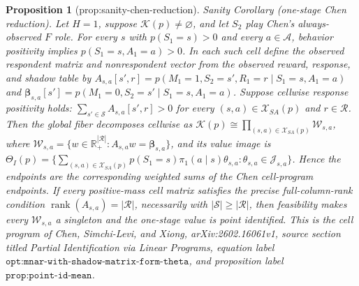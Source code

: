 \documentclass{article}
\newtheorem{proposition}{Proposition}
\begin{document}
\begin{proposition}[prop:sanity-chen-reduction]\label{prop:sanity-chen-reduction}
Sanity Corollary (one-stage Chen reduction). Let \(H=1\), suppose \(\mathcal K(p)\ne\varnothing\), and let \(S_2\) play Chen's always-observed \(F\) role. For every \(s\) with \(p(S_1=s)>0\) and every \(a\in\mathcal A\), behavior positivity implies \(p(S_1=s,A_1=a)>0\). In each such cell define the observed respondent matrix and nonrespondent vector from the observed reward, response, and shadow table by \(A_{s,a}[s',r]=p(M_1=1,S_2=s',R_1=r\mid S_1=s,A_1=a)\) and \(\boldsymbol\beta_{s,a}[s']=p(M_1=0,S_2=s'\mid S_1=s,A_1=a)\). Suppose cellwise response positivity holds: \(\sum_{s'\in\mathcal S}A_{s,a}[s',r]>0\) for every \((s,a)\in\mathcal X_{SA}(p)\) and \(r\in\mathcal R\). Then the global fiber decomposes cellwise as \(\mathcal K(p)\cong\prod_{(s,a)\in\mathcal X_{SA}(p)}\mathcal W_{s,a}\), where \(\mathcal W_{s,a}=\{w\in\mathbb R_+^{|\mathcal R|}:A_{s,a}w=\boldsymbol\beta_{s,a}\}\), and its value image is \(\Theta_I(p)=\{\sum_{(s,a)\in\mathcal X_{SA}(p)}p(S_1=s)\pi_1(a\mid s)\theta_{s,a}:\theta_{s,a}\in\mathcal J_{s,a}\}\). Hence the endpoints are the corresponding weighted sums of the Chen cell-program endpoints. If every positive-mass cell matrix satisfies the precise full-column-rank condition \(\operatorname{rank}(A_{s,a})=|\mathcal R|\), necessarily with \(|\mathcal S|\ge|\mathcal R|\), then feasibility makes every \(\mathcal W_{s,a}\) a singleton and the one-stage value is point identified. This is the cell program of Chen, Simchi-Levi, and Xiong, arXiv:2602.16061v1, source section titled \emph{Partial Identification via Linear Programs}, equation label \(\texttt{opt:mnar-with-shadow-matrix-form-theta}\), and proposition label \(\texttt{prop:point-id-mean}\).
\end{proposition}
\end{document}

